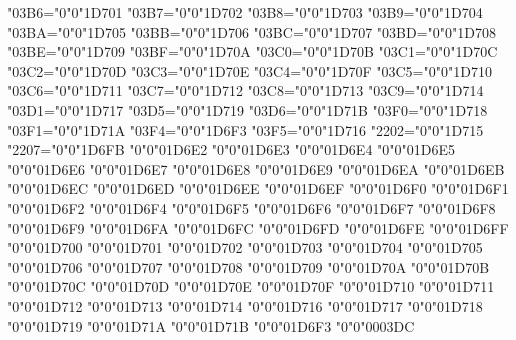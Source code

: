 {    \Umathcode"03B6="0"0"1D701%
    \Umathcode"03B7="0"0"1D702%
    \Umathcode"03B8="0"0"1D703%
    \Umathcode"03B9="0"0"1D704%
    \Umathcode"03BA="0"0"1D705%
    \Umathcode"03BB="0"0"1D706%
    \Umathcode"03BC="0"0"1D707%
    \Umathcode"03BD="0"0"1D708%
    \Umathcode"03BE="0"0"1D709%
    \Umathcode"03BF="0"0"1D70A%
    \Umathcode"03C0="0"0"1D70B%
    \Umathcode"03C1="0"0"1D70C%
    \Umathcode"03C2="0"0"1D70D%
    \Umathcode"03C3="0"0"1D70E%
    \Umathcode"03C4="0"0"1D70F%
    \Umathcode"03C5="0"0"1D710%
    \Umathcode"03C6="0"0"1D711%
    \Umathcode"03C7="0"0"1D712%
    \Umathcode"03C8="0"0"1D713%
    \Umathcode"03C9="0"0"1D714%
    \Umathcode"03D1="0"0"1D717%
    \Umathcode"03D5="0"0"1D719%
    \Umathcode"03D6="0"0"1D71B%
    \Umathcode"03F0="0"0"1D718%
    \Umathcode"03F1="0"0"1D71A%
    \Umathcode"03F4="0"0"1D6F3%
    \Umathcode"03F5="0"0"1D716%
    \Umathcode"2202="0"0"1D715%
    \Umathcode"2207="0"0"1D6FB%
    \Umathchardef\Alpha     "0"0"01D6E2%
    \Umathchardef\Beta      "0"0"01D6E3%
    \Umathchardef\Gamma     "0"0"01D6E4%
    \Umathchardef\Delta     "0"0"01D6E5%
    \Umathchardef\Epsilon   "0"0"01D6E6%
    \Umathchardef\Zeta      "0"0"01D6E7%
    \Umathchardef\Eta       "0"0"01D6E8%
    \Umathchardef\Theta     "0"0"01D6E9%
    \Umathchardef\Iota      "0"0"01D6EA%
    \Umathchardef\Kappa     "0"0"01D6EB%
    \Umathchardef\Lambda    "0"0"01D6EC%
    \Umathchardef\Mu        "0"0"01D6ED%
    \Umathchardef\Nu        "0"0"01D6EE%
    \Umathchardef\Xi        "0"0"01D6EF%
    \Umathchardef\Omicron   "0"0"01D6F0%
    \Umathchardef\Pi        "0"0"01D6F1%
    \Umathchardef\Rho       "0"0"01D6F2%
    \Umathchardef\Sigma     "0"0"01D6F4%
    \Umathchardef\Tau       "0"0"01D6F5%
    \Umathchardef\Upsilon   "0"0"01D6F6%
    \Umathchardef\Phi       "0"0"01D6F7%
    \Umathchardef\Chi       "0"0"01D6F8%
    \Umathchardef\Psi       "0"0"01D6F9%
    \Umathchardef\Omega     "0"0"01D6FA%
    \Umathchardef\alpha     "0"0"01D6FC%
    \Umathchardef\beta      "0"0"01D6FD%
    \Umathchardef\gamma     "0"0"01D6FE%
    \Umathchardef\delta     "0"0"01D6FF%
    \Umathchardef\varepsilon"0"0"01D700%
    \Umathchardef\zeta      "0"0"01D701%
    \Umathchardef\eta       "0"0"01D702%
    \Umathchardef\theta     "0"0"01D703%
    \Umathchardef\iota      "0"0"01D704%
    \Umathchardef\kappa     "0"0"01D705%
    \Umathchardef\lambda    "0"0"01D706%
    \Umathchardef\mu        "0"0"01D707%
    \Umathchardef\nu        "0"0"01D708%
    \Umathchardef\xi        "0"0"01D709%
    \Umathchardef\omicron   "0"0"01D70A%
    \Umathchardef\pi        "0"0"01D70B%
    \Umathchardef\rho       "0"0"01D70C%
    \Umathchardef\varsigma  "0"0"01D70D%
    \Umathchardef\sigma     "0"0"01D70E%
    \Umathchardef\tau       "0"0"01D70F%
    \Umathchardef\upsilon   "0"0"01D710%
    \Umathchardef\varphi    "0"0"01D711%
    \Umathchardef\chi       "0"0"01D712%
    \Umathchardef\psi       "0"0"01D713%
    \Umathchardef\omega     "0"0"01D714%
    \Umathchardef\epsilon   "0"0"01D716%
    \Umathchardef\vartheta  "0"0"01D717%
    \Umathchardef\varkappa  "0"0"01D718%
    \Umathchardef\phi       "0"0"01D719%
    \Umathchardef\varrho    "0"0"01D71A%
    \Umathchardef\varpi     "0"0"01D71B%
    \Umathchardef\varTheta  "0"0"01D6F3%
    \Umathchardef\digamma   "0"0"0003DC%
    \relax
}

